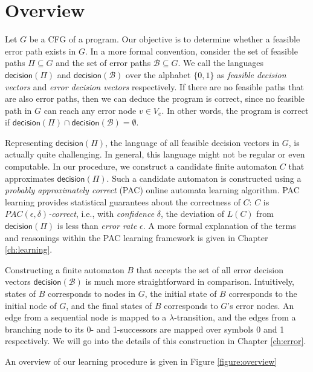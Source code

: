 
\chapter{Overview}\label{ch:overview}

Let $G$ be a CFG of a program. Our objective is to determine whether a feasible error path exists in $G$. In a more formal convention, consider the set of feasible paths $\Pi \subseteq G$ and the set of error paths $\mathcal{B} \subseteq G$. We call the languages $\mathsf{decision}(\Pi)$ and $\mathsf{decision}(\mathcal{B})$ over the alphabet $\{0,1\}$ as \emph{feasible decision vectors} and \emph{error decision vectors} respectively. If there are no feasible paths that are also error paths, then we can deduce the program is correct, since no feasible path in $G$ can reach any error node $v \in V_e$. In other words, the program is correct if $\mathsf{decision}(\Pi) \cap \mathsf{decision}(\mathcal{B}) = \emptyset$. 

Representing $\mathsf{decision}(\Pi)$, the language of all feasible decision vectors in $G$, is actually quite challenging. In general, this language might not be regular or even computable. In our procedure, we construct a candidate finite automaton $C$ that approximates $\mathsf{decision}(\Pi)$. Such a candidate automaton is constructed using a \emph{probably approximately correct} (PAC) online automata learning algorithm. PAC learning provides statistical guarantees about the correctness of $C$: $C$ is \emph{$PAC(\epsilon, \delta)$-correct}, i.e., with \emph{confidence} $\delta$, the deviation of $L(C)$ from $\mathsf{decision}(\Pi)$ is less than \emph{error rate} $\epsilon$. A more formal explanation of the terms and reasonings within the PAC learning framework is given in Chapter \ref{ch:learning}.

Constructing a finite automaton $B$ that accepts the set of all error decision vectors $\mathsf{decision}(\mathcal{B})$ is much more straightforward in comparison. Intuitively, states of $B$ corresponds to nodes in $G$, the initial state of $B$ corresponds to the initial node of $G$, and the final states of $B$ corresponds to $G$'s error nodes. An edge from a sequential node is mapped to a $\lambda$-transition, and the edges from a branching node to its 0- and 1-successors are mapped over symbols 0 and 1 respectively. We will go into the details of this construction in Chapter \ref{ch:error}.

An overview of our learning procedure is given in Figure \ref{figure:overview}

